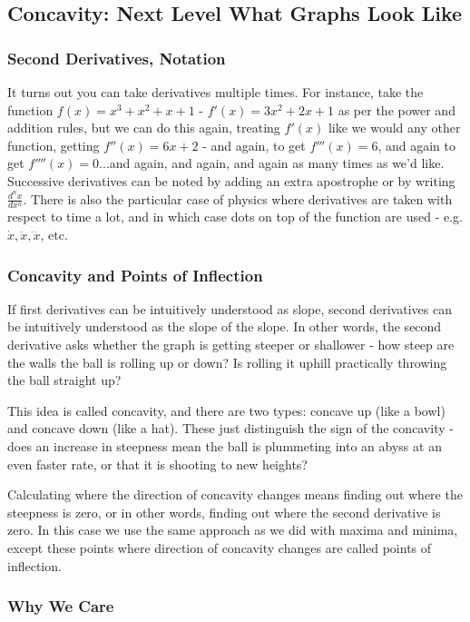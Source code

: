 \subsection{Concavity: Next Level What Graphs Look Like}
\subsubsection{Second Derivatives, Notation}

It turns out you can take derivatives multiple times. For instance, take the function $f(x) = x^3 + x^2 + x + 1$ - $f'(x) = 3x^2 + 2x + 1$ as per the power and addition rules, but we can do this again, treating $f'(x)$ like we would any other function, getting $f''(x) = 6x + 2$ - and again, to get $f'''(x) = 6$, and again to get $f''''(x) = 0$...and again, and again, and again as many times as we'd like. Successive derivatives can be noted by adding an extra apostrophe or by writing $\frac{d^n x}{dx^n}$. There is also the particular case of physics where derivatives are taken with respect to time a lot, and in which case dots on top of the function are used - e.g. $\dot x, \ddot x, \dddot x$, etc.

\subsubsection{Concavity and Points of Inflection}

If first derivatives can be intuitively understood as slope, second derivatives can be intuitively understood as the slope of the slope. In other words, the second derivative asks whether the graph is getting steeper or shallower - how steep are the walls the ball is rolling up or down? Is rolling it uphill practically throwing the ball straight up?

This idea is called concavity, and there are two types: concave up (like a bowl) and concave down (like a hat). These just distinguish the sign of the concavity - does an increase in steepness mean the ball is plummeting into an abyss at an even faster rate, or that it is shooting to new heights?

Calculating where the direction of concavity changes means finding out where the steepness is zero, or in other words, finding out where the second derivative is zero. In this case we use the same approach as we did with maxima and minima, except these points where direction of concavity changes are called points of inflection.

\subsubsection{Why We Care}

